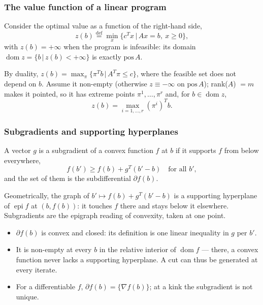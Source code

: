 \documentclass[aspectratio=169]{beamer}
\providecommand{\red}{\color{red}}
\begin{document}
\begin{frame}
\frametitle{The value function of a linear program}

Consider the optimal value as a function of the right-hand side,
\[
z(b) \overset{\mathrm{def}}{=} \min_x \lbrace c^Tx \,|\, Ax = b,\ x \geq 0 \rbrace,
\]
with $z(b) = +\infty$ when the program is infeasible: its {\red domain} $\operatorname{dom} z = \lbrace b \,|\, z(b) < +\infty \rbrace$ is exactly $\text{pos}\,A$.

\mbox{}

By duality, $z(b) = \max_{\pi} \lbrace \pi^Tb \,|\, A^T\pi \leq c \rbrace$, where the feasible set {\red does not depend on $b$}.
Assume it non-empty (otherwise $z \equiv -\infty$ on $\text{pos}\,A$); rank($A$) $= m$ makes it pointed, so it has extreme points $\pi^1, \ldots, \pi^r$ and, for $b \in \operatorname{dom} z$,
\[
z(b) = \max_{i = 1,\ldots,r} (\pi^i)^Tb.
\]

\end{frame}

\begin{frame}
\frametitle{Subgradients and supporting hyperplanes}

A vector $g$ is a {\red subgradient} of a convex function $f$ at $b$ if it supports $f$ from below everywhere,
\[
f(b') \geq f(b) + g^T(b'-b) \quad \text{for all } b',
\]
and the set of them is the {\red subdifferential} $\partial f(b)$.

\mbox{}

Geometrically, the graph of $b' \mapsto f(b) + g^T(b'-b)$ is a {\red supporting hyperplane} of $\operatorname{epi} f$ at $(b,f(b))$: it touches $f$ there and stays below it elsewhere. Subgradients are the epigraph reading of convexity, taken at one point.

\vspace{1mm}

\begin{itemize}
	\item
	$\partial f(b)$ is {\red convex and closed}: its definition is one linear inequality in $g$ per $b'$.
	\item
	It is {\red non-empty} at every $b$ in the relative interior of $\operatorname{dom} f$ --- there, a convex function never lacks a supporting hyperplane. A cut can thus be generated at {\red every} iterate.
	\item
	For a differentiable $f$, $\partial f(b) = \lbrace \nabla f(b) \rbrace$; at a kink the subgradient is not unique.
\end{itemize}

\end{frame}
\end{document}
